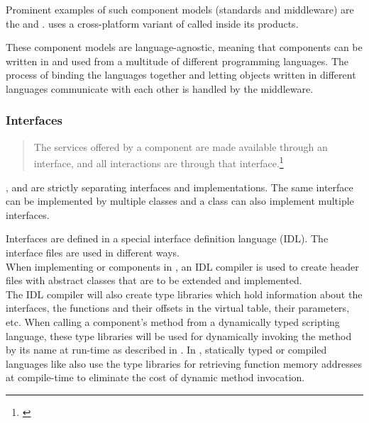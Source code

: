 Prominent examples of such component models (standards and middleware) are the  and .  uses a cross-platform variant of  called  inside its products.

These component models are language-agnostic, meaning that components can be written in and used from a multitude of different programming languages. The process of binding the languages together and letting objects written in different languages communicate with each other is handled by the middleware.

\subsubsection{Interfaces}

\begin{quotation}
The services offered by a component are made available through an interface, and all interactions are through that interface.\footnote{\citep[444]{Sommerville}}
\end{quotation}

,  and  are strictly separating interfaces and implementations. The same interface can be implemented by multiple classes and a class can also implement multiple interfaces.

Interfaces are defined in a special interface definition language (IDL). The interface files are used in different ways.\\
When implementing  or  components in , an IDL compiler is used to create header files with abstract classes that are to be extended and implemented.\\
The IDL compiler will also create type libraries which hold information about the interfaces, the functions and their offsets in the virtual table, their parameters, etc. When calling a component's method from a dynamically typed scripting language, these type libraries will be used for dynamically invoking the method by its name at run-time as described in . In , statically typed or compiled languages like  also use the type libraries for retrieving function memory addresses at compile-time to eliminate the cost of dynamic method invocation.  

